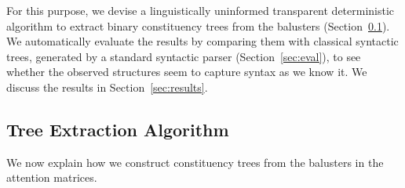 \documentclass[11pt,a4paper]{article}
\newcommand\eg{e.g.\ }
\newcommand\ie{i.e.\ }
\newcommand{\word}{\emph{input state}\xspace}
\newcommand{\states}{\emph{output states}\xspace}
\def\RR#1{{\color{blue}RR: \it #1}}
\def\RR#1{}
\begin{document}
For this purpose, we devise a linguistically uninformed transparent deterministic algorithm to extract binary constituency trees from the balusters (Section~\ref{sec:algorithm}).
We automatically evaluate the results by comparing them with classical syntactic trees, generated by a standard syntactic parser (Section~\ref{sec:eval}), to see whether the observed structures seem to capture syntax as we know it.
We discuss the results in Section~\ref{sec:results}.




\subsection{Tree Extraction Algorithm}
\label{sec:algorithm}




We now explain how we construct constituency trees from the balusters in the attention matrices.
\end{document}
